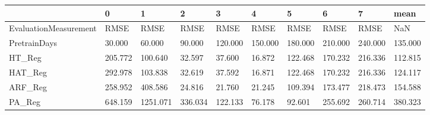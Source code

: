\begin{tabular}{llllllllll}
\toprule
{} &       0 &        1 &       2 &       3 &       4 &       5 &       6 &       7 &    mean \\
\midrule
EvaluationMeasurement &    RMSE &     RMSE &    RMSE &    RMSE &    RMSE &    RMSE &    RMSE &    RMSE &     NaN \\
PretrainDays          &  30.000 &   60.000 &  90.000 & 120.000 & 150.000 & 180.000 & 210.000 & 240.000 & 135.000 \\
HT\_Reg                & 205.772 &  100.640 &  32.597 &  37.600 &  16.872 & 122.468 & 170.232 & 216.336 & 112.815 \\
HAT\_Reg               & 292.978 &  103.838 &  32.619 &  37.592 &  16.871 & 122.468 & 170.232 & 216.336 & 124.117 \\
ARF\_Reg               & 258.952 &  408.586 &  24.816 &  21.760 &  21.245 & 109.394 & 173.477 & 218.473 & 154.588 \\
PA\_Reg                & 648.159 & 1251.071 & 336.034 & 122.133 &  76.178 &  92.601 & 255.692 & 260.714 & 380.323 \\
\bottomrule
\end{tabular}
